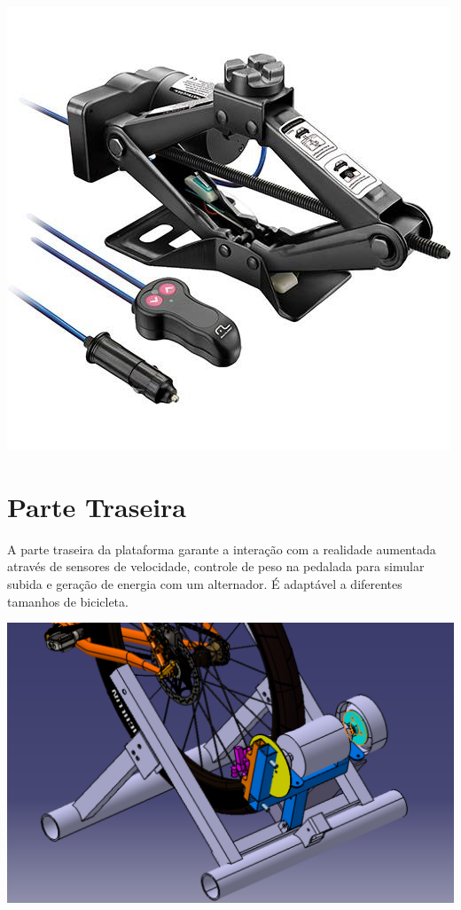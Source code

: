     \begin{center}
    	\includegraphics[scale=0.7]{figuras/macaco_eletrico_1}
        \label{macaco_eletrico_1}
    \end{center}    

\section{Parte Traseira}
    A parte traseira da plataforma garante a interação com a realidade aumentada através de sensores de velocidade, controle de peso na pedalada para simular subida e geração de energia com um alternador. É adaptável a diferentes tamanhos de bicicleta.
 
    \begin{center}
    	\includegraphics[scale=0.7]{figuras/parte_traseira}
        \label{parte_traseira_1}
    \end{center}    

